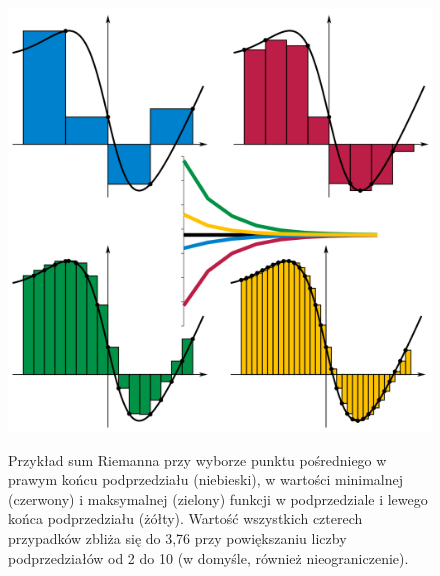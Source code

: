 \documentclass[a4paper,11pt]{article}
\begin{document}
\begin{figure}[htb]
\begin{mdframed}[backgroundcolor=red!20]
\includegraphics[scale=0.5]{Riemann_sum_convergence.png}

Przykład sum Riemanna przy wyborze punktu pośredniego w prawym końcu podprzedziału (niebieski), w wartości minimalnej (czerwony) i maksymalnej (zielony) funkcji w podprzedziale i lewego końca podprzedziału (żółty). Wartość wszystkich czterech przypadków zbliża się do 3,76 przy powiększaniu liczby podprzedziałów od 2 do 10 (w domyśle, również nieograniczenie).
\end{mdframed}
\label{fig:pic}
\end{figure}
\end{document}
